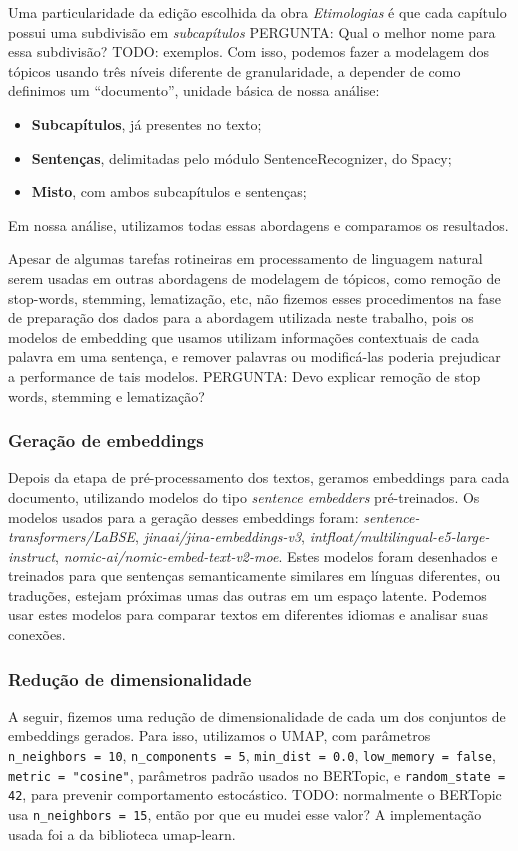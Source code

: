 Uma particularidade da edição escolhida da obra \textit{Etimologias} é que cada capítulo possui uma subdivisão em \textit{subcapítulos} PERGUNTA: Qual o melhor nome para essa subdivisão? TODO: exemplos. Com isso, podemos fazer a modelagem dos tópicos usando três níveis diferente de granularidade, a depender de como definimos um ``documento'', unidade básica de nossa análise:
\begin{itemize}
    \item \textbf{Subcapítulos}, já presentes no texto;
    \item \textbf{Sentenças}, delimitadas pelo módulo SentenceRecognizer, do Spacy;
    \item \textbf{Misto}, com ambos subcapítulos e sentenças;
\end{itemize}
Em nossa análise, utilizamos todas essas abordagens e comparamos os resultados.

Apesar de algumas tarefas rotineiras em processamento de linguagem natural serem usadas em outras abordagens de modelagem de tópicos, como remoção de stop-words, stemming, lematização, etc, não fizemos esses procedimentos na fase de preparação dos dados para a abordagem utilizada neste trabalho, pois os modelos de embedding que usamos utilizam informações contextuais de cada palavra em uma sentença, e remover palavras ou modificá-las poderia prejudicar a performance de tais modelos. PERGUNTA: Devo explicar remoção de stop words, stemming e lematização?

\subsubsection{Geração de embeddings}
Depois da etapa de pré-processamento dos textos, geramos embeddings para cada documento, utilizando modelos do tipo \textit{sentence embedders} pré-treinados. Os modelos usados para a geração desses embeddings foram: \textit{sentence-transformers/LaBSE}, \textit{jinaai/jina-embeddings-v3}, \textit{intfloat/multilingual-e5-large-instruct}, \textit{nomic-ai/nomic-embed-text-v2-moe}. Estes modelos foram desenhados e treinados para que sentenças semanticamente similares em línguas diferentes, ou traduções, estejam próximas umas das outras em um espaço latente. Podemos usar estes modelos para comparar textos em diferentes idiomas e analisar suas conexões.

\subsubsection{Redução de dimensionalidade}
A seguir, fizemos uma redução de dimensionalidade de cada um dos conjuntos de embeddings gerados.
Para isso, utilizamos o UMAP, com parâmetros \verb|n_neighbors = 10|, \verb|n_components = 5|, \verb|min_dist = 0.0|, \verb|low_memory = false|, \verb|metric = "cosine"|, parâmetros padrão usados no BERTopic, e \verb|random_state = 42|, para prevenir comportamento estocástico. TODO: normalmente o BERTopic usa \verb|n_neighbors = 15|, então por que eu mudei esse valor?
A implementação usada foi a da biblioteca umap-learn.

